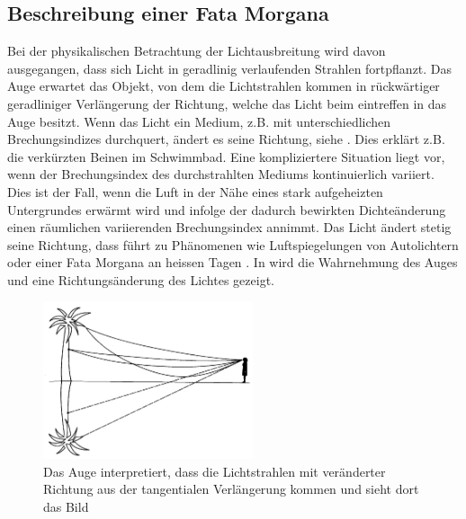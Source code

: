 \subsection{Beschreibung einer Fata Morgana}
Bei der physikalischen Betrachtung der Lichtausbreitung wird davon ausgegangen, dass sich Licht in
geradlinig verlaufenden Strahlen fortpflanzt. Das Auge erwartet das Objekt, von dem die Lichtstrahlen
kommen in rückwärtiger geradliniger Verlängerung der Richtung, welche das Licht beim eintreffen in das Auge besitzt.
Wenn das Licht ein Medium, z.B. mit unterschiedlichen Brechungsindizes durchquert, ändert es seine Richtung, siehe . Dies erklärt z.B. die verkürzten Beinen im Schwimmbad.
Eine kompliziertere Situation liegt vor, wenn der Brechungsindex des durchstrahlten Mediums kontinuierlich variiert. 
Dies ist der Fall, wenn die Luft in der Nähe eines stark aufgeheizten Untergrundes erwärmt
wird und infolge der dadurch bewirkten Dichteänderung einen räumlichen variierenden Brechungsindex annimmt. 
Das Licht ändert stetig seine Richtung, dass führt zu Phänomenen wie Luftspiegelungen von Autolichtern oder einer Fata Morgana an heissen Tagen \cite{fataEinleitung}.
In  wird die Wahrnehmung des Auges und eine Richtungsänderung des Lichtes gezeigt.
\begin{figure}[h]
\begin{center}
\includegraphics[width=0.55\textwidth]{./picture/FataEinleitung.png}
	\caption{Das Auge interpretiert, dass die Lichtstrahlen mit veränderter Richtung aus der tangentialen Verlängerung kommen und sieht dort das Bild}
	\label{Ab:fataEinleitung}
\end{center}	
\end{figure}
